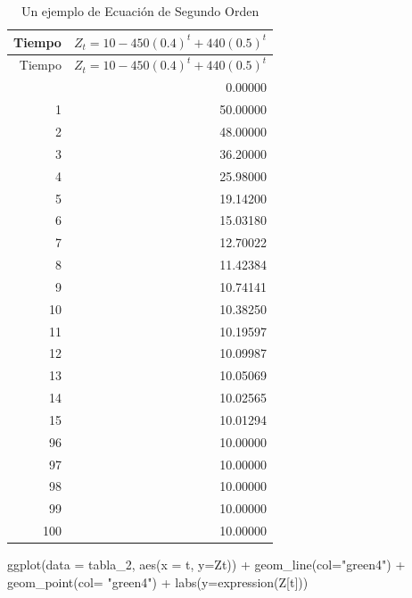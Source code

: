 \documentclass[
  a4paper,
]{article}
\newenvironment{Shaded}{}{}
\newcommand{\AttributeTok}[1]{\textcolor[rgb]{0.84,0.23,0.29}{#1}}
\newcommand{\FunctionTok}[1]{\textcolor[rgb]{0.44,0.26,0.76}{#1}}
\newcommand{\NormalTok}[1]{\textcolor[rgb]{0.14,0.16,0.18}{#1}}
\newcommand{\SpecialCharTok}[1]{\textcolor[rgb]{0.00,0.36,0.77}{#1}}
\newcommand{\StringTok}[1]{\textcolor[rgb]{0.01,0.18,0.38}{#1}}
\begin{document}
\begin{longtable}[]{@{}rr@{}}
\caption{Un ejemplo de Ecuación de Segundo Orden}\tabularnewline
\toprule\noalign{}
Tiempo & \(Z_t =10-450(0.4)^t+440(0.5)^t\) \\
\midrule\noalign{}
\endfirsthead
\toprule\noalign{}
Tiempo & \(Z_t =10-450(0.4)^t+440(0.5)^t\) \\
\midrule\noalign{}
\endhead
\bottomrule\noalign{}
\endlastfoot
0 & 0.00000 \\
1 & 50.00000 \\
2 & 48.00000 \\
3 & 36.20000 \\
4 & 25.98000 \\
5 & 19.14200 \\
6 & 15.03180 \\
7 & 12.70022 \\
8 & 11.42384 \\
9 & 10.74141 \\
10 & 10.38250 \\
11 & 10.19597 \\
12 & 10.09987 \\
13 & 10.05069 \\
14 & 10.02565 \\
15 & 10.01294 \\
96 & 10.00000 \\
97 & 10.00000 \\
98 & 10.00000 \\
99 & 10.00000 \\
100 & 10.00000 \\
\end{longtable}

\begin{Shaded}
\begin{Highlighting}[]
\FunctionTok{ggplot}\NormalTok{(}\AttributeTok{data =}\NormalTok{ tabla\_2, }\FunctionTok{aes}\NormalTok{(}\AttributeTok{x =}\NormalTok{ t, }\AttributeTok{y=}\NormalTok{Zt)) }\SpecialCharTok{+}
  \FunctionTok{geom\_line}\NormalTok{(}\AttributeTok{col=}\StringTok{"green4"}\NormalTok{) }\SpecialCharTok{+}
  \FunctionTok{geom\_point}\NormalTok{(}\AttributeTok{col=} \StringTok{"green4"}\NormalTok{) }\SpecialCharTok{+}
  \FunctionTok{labs}\NormalTok{(}\AttributeTok{y=}\FunctionTok{expression}\NormalTok{(Z[t]))}
\end{Highlighting}
\end{Shaded}
\end{document}
